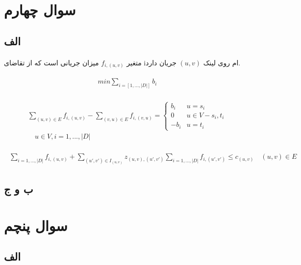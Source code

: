 \documentclass[paper=a4, fontsize=11pt]{article}
\numberwithin{equation}{section} %
\numberwithin{figure}{section} %
\numberwithin{table}{section} %
\begin{document}
\section{سوال چهارم}
\subsection{الف}
\paragraph{}
متغیر $f_{i,(u,v)}$ میزان جریانی است که از تقاضای iام روی لینک
$(u,v)$ جریان دارد.

\begin{align}
\begin{split}
	min \sum_{i = [1, ..., |D|]} b_i
\end{split}
\end{align}

\begin{align}
\begin{split}
	\sum_{(u,v) \in E} f_{i,(u,v)} - \sum_{(v,u) \in E} f_{i,(v,u)} = 
	\left \{
		\begin{array}{cc}
			b_i & u = s_i\\
			0 & u \in V - {s_i, t_i}\\
			-b_i & u = t_i
		\end{array}
	\right.
	\\
	\quad u \in V, i = {1, ..., |D|}
\end{split}
\end{align}

\begin{align}
\begin{split}
	\sum_{i = {1, ..., |D|}} f_{i,(u,v)} + \sum_{(u',v') \in I_{(u,v)}} z_{(u,v),(u',v')} \sum_{i = {1, ..., |D|}} f_{i,(u',v')} \le c_{(u,v)}
	\quad (u,v) \in E
\end{split}
\end{align}

\subsection{ب و ج}


\section{سوال پنچم}
\subsection{الف}
\end{document}
